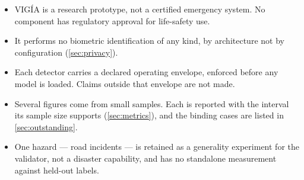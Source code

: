 \begin{itemize}
  \item VIGÍA is a research prototype, not a certified emergency system. No
        component has regulatory approval for life-safety use.
  \item It performs no biometric identification of any kind, by architecture
        not by configuration (\cref{sec:privacy}).
  \item Each detector carries a declared operating envelope, enforced before
        any model is loaded. Claims outside that envelope are not made.
  \item Several figures come from small samples. Each is reported with the
        interval its sample size supports (\cref{sec:metrics}), and the
        binding cases are listed in \cref{sec:outstanding}.
  \item One hazard — road incidents — is retained as a generality experiment
        for the validator, not a disaster capability, and has no
        standalone measurement against held-out labels.
\end{itemize}
